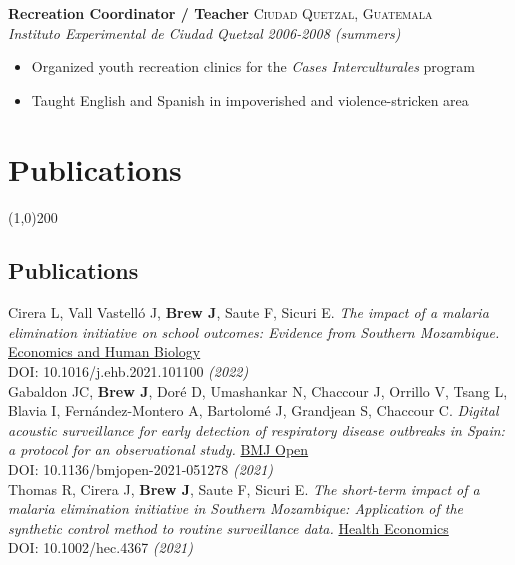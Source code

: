 \documentclass[11pt]{article}
\begin{document}
{\noindent \textbf{Recreation Coordinator / Teacher} \hfill \textsc{Ciudad Quetzal, Guatemala}\\
\noindent \emph{Instituto Experimental de Ciudad Quetzal} \hfill \emph{2006-2008 (summers)}
\vspace{-2mm}
\begin{itemize}\itemsep0pt \parskip0pt 
\item Organized youth recreation clinics for the \textit{Cases Interculturales} program
\item Taught English and Spanish in impoverished and violence-stricken area
\end{itemize}

\newpage


\section*{Publications} %
\vspace{-7mm}
\line(1,0){200}
\vspace{2mm}

\subsection*{Publications}

\noindent Cirera L, Vall Vastelló J, \textbf{Brew J}, Saute F, Sicuri E. \emph{The impact of a malaria elimination initiative on school outcomes: Evidence from Southern Mozambique.} \href{https://doi.org/10.1016/j.ehb.2021.101100}{Economics and Human Biology} \\ DOI: 10.1016/j.ehb.2021.101100 \hfill \emph{(2022)} \\


\noindent Gabaldon JC, \textbf{Brew J}, Doré D, Umashankar N, Chaccour J, Orrillo V, Tsang L, Blavia I, Fernández-Montero A, Bartolomé J, Grandjean S, Chaccour C. \emph{Digital acoustic surveillance for early detection of respiratory disease outbreaks in Spain: a protocol for an observational study.} \href{https://10.1136/bmjopen-2021-051278}{BMJ Open} \\ DOI: 10.1136/bmjopen-2021-051278  \hfill \emph{(2021)} \\

\noindent Thomas R, Cirera J, \textbf{Brew J}, Saute F, Sicuri E. \emph{The short-term impact of a malaria elimination initiative in Southern Mozambique: Application of the synthetic control method to routine surveillance data.} \href{https://doi.org/10.1002/hec.4367}{Health Economics} \\ DOI: 10.1002/hec.4367  \hfill \emph{(2021)} \\

}
\end{document}
